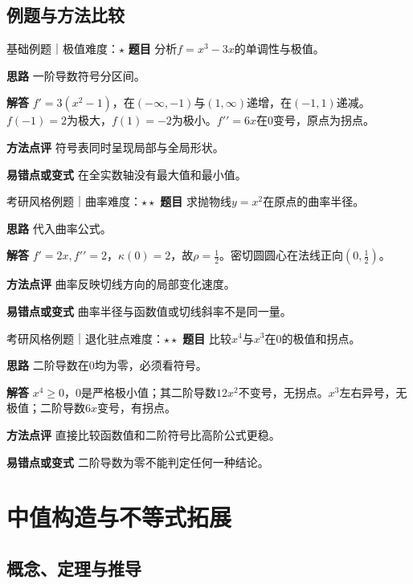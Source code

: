 \subsection{例题与方法比较}
\begin{example}{基础例题｜极值}{难度：$\star$}
\label{ex:2:10}\textbf{题目} 分析$f=x^3-3x$的单调性与极值。\par
\textbf{思路} 一阶导数符号分区间。\par
\textbf{解答} $f\prime=3(x^2-1)$，在$(-\infty,-1)$与$(1,\infty)$递增，在$(-1,1)$递减。$f(-1)=2$为极大，$f(1)=-2$为极小。$f\prime\prime=6x$在0变号，原点为拐点。\par
\textbf{方法点评} 符号表同时呈现局部与全局形状。\par
\textbf{易错点或变式} 在全实数轴没有最大值和最小值。
\end{example}
\begin{example}{考研风格例题｜曲率}{难度：$\star\star$}
\label{ex:2:11}\textbf{题目} 求抛物线$y=x^2$在原点的曲率半径。\par
\textbf{思路} 代入曲率公式。\par
\textbf{解答} $f\prime=2x,f\prime\prime=2$，$\kappa(0)=2$，故$\rho=\frac{1}{2}$。密切圆圆心在法线正向$(0,\frac{1}{2})$。\par
\textbf{方法点评} 曲率反映切线方向的局部变化速度。\par
\textbf{易错点或变式} 曲率半径与函数值或切线斜率不是同一量。
\end{example}
\begin{example}{考研风格例题｜退化驻点}{难度：$\star\star$}
\label{ex:2:12}\textbf{题目} 比较$x^4$与$x^3$在0的极值和拐点。\par
\textbf{思路} 二阶导数在0均为零，必须看符号。\par
\textbf{解答} $x^4\ge0$，0是严格极小值；其二阶导数$12x^2$不变号，无拐点。$x^3$左右异号，无极值；二阶导数$6x$变号，有拐点。\par
\textbf{方法点评} 直接比较函数值和二阶符号比高阶公式更稳。\par
\textbf{易错点或变式} 二阶导数为零不能判定任何一种结论。
\end{example}
\section{中值构造与不等式拓展}\label{sec:2:5}
\subsection{概念、定理与推导}


